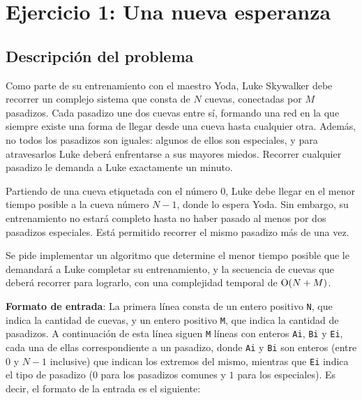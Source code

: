 \section{Ejercicio 1: Una nueva esperanza}

    \subsection{Descripción del problema}

    Como parte de su entrenamiento con el maestro Yoda, Luke Skywalker debe
    recorrer un complejo sistema que consta de $N$ cuevas, conectadas por $M$
    pasadizos. Cada pasadizo une dos cuevas entre sí, formando una red en la
    que siempre existe una forma de llegar desde una cueva hasta cualquier
    otra. Además, no todos los pasadizos son iguales: algunos de ellos son
    especiales, y para atravesarlos Luke deberá enfrentarse a sus mayores
    miedos. Recorrer cualquier pasadizo le demanda a Luke exactamente un
    minuto.

    Partiendo de una cueva etiquetada con el número $0$, Luke debe llegar en
    el menor tiempo posible a la cueva número $N-1$, donde lo espera Yoda.
    Sin embargo, su entrenamiento no estará completo hasta no haber pasado al
    menos por dos pasadizos especiales. Está permitido recorrer el mismo
    pasadizo más de una vez.

    Se pide implementar un algoritmo que determine el menor tiempo posible que
    le demandará a Luke completar su entrenamiento, y la secuencia de cuevas
    que deberá recorrer para lograrlo, con una complejidad temporal de
    $\operatorname{O}(N + M)$.

    \vspace{1.25em}

    \textbf{Formato de entrada}: La primera línea consta de un entero positivo
    \texttt{N}, que indica la cantidad de cuevas, y un entero positivo
    \texttt{M}, que indica la cantidad de pasadizos. A continuación de esta
    línea siguen \texttt{M} líneas con enteros \texttt{Ai}, \texttt{Bi} y
    \texttt{Ei}, cada una de ellas correspondiente a un pasadizo, donde
    \texttt{Ai} y \texttt{Bi} son enteros (entre $0$ y $N-1$ inclusive) que
    indican los extremos del mismo, mientras que \texttt{Ei} indica
    el tipo de pasadizo ($0$ para los pasadizos comunes y $1$ para los
    especiales). Es decir, el formato de la entrada es el siguiente:

